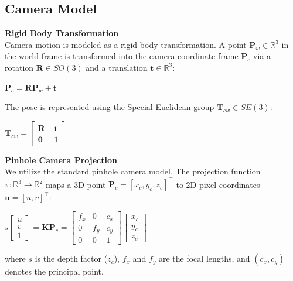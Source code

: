 \subsection{Camera Model}

\textbf{Rigid Body Transformation} \\
Camera motion is modeled as a rigid body transformation. A point $\mathbf{P}_w \in \mathbb{R}^3$ in the world frame is transformed into the camera coordinate frame $\mathbf{P}_c$ via a rotation $\mathbf{R} \in SO(3)$ and a translation $\mathbf{t} \in \mathbb{R}^3$:
\begin{center}
    $\displaystyle \mathbf{P}_c = \mathbf{R}\mathbf{P}_w + \mathbf{t}$
\end{center}
The pose is represented using the Special Euclidean group $\mathbf{T}_{cw} \in SE(3)$:
\begin{center}
    $\displaystyle \mathbf{T}_{cw} =
    \begin{bmatrix}
        \mathbf{R} & \mathbf{t} \\
        \mathbf{0}^\top & 1
    \end{bmatrix}$
\end{center}

\textbf{Pinhole Camera Projection} \\
We utilize the standard pinhole camera model. The projection function $\pi: \mathbb{R}^3 \to \mathbb{R}^2$ maps a 3D point $\mathbf{P}_c = [x_c, y_c, z_c]^\top$ to 2D pixel coordinates $\mathbf{u} = [u, v]^\top$:
\begin{center}
    $\displaystyle s
    \begin{bmatrix}
        u \\
        v \\
        1
    \end{bmatrix}
    =
    \mathbf{K}\mathbf{P}_c
    =
    \begin{bmatrix}
        f_x & 0 & c_x \\
        0 & f_y & c_y \\
        0 & 0 & 1
    \end{bmatrix}
    \begin{bmatrix}
        x_c \\
        y_c \\
        z_c
    \end{bmatrix}$
\end{center}
where $s$ is the depth factor ($z_c$), $f_x$ and $f_y$ are the focal lengths, and $(c_x, c_y)$ denotes the principal point.

